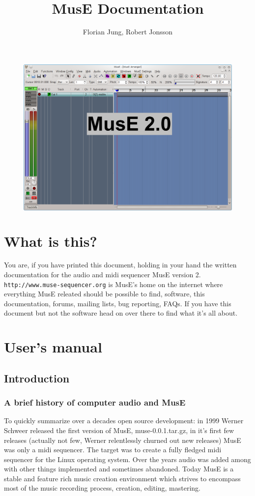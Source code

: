 \documentclass[a4paper]{report}
\author{Florian Jung, Robert Jonsson}
\title{MusE Documentation}
\newcommand{\url}[1]{\texttt{#1}}
\begin{document}
\label{Main/Arranger}
\begin{figure}[htp]
\centering
\includegraphics[width=1.0\textwidth]{pics/muse2}
\label{fig:MusE}
\end{figure}
\chapter {What is this?}
You are, if you have printed this document, holding in your hand the
written documentation for the audio and midi sequencer MusE version 2.\\ 
\url{http://www.muse-sequencer.org} is MusE's home on the internet where
everything MusE releated should be possible to find, software, this
documentation, forums, mailing lists, bug reporting, FAQs. If you have
this document but not the software head on over there to find what it's
all about.
\chapter{User's manual}

\section {Introduction}
\subsection {A brief history of computer audio and MusE}
To quickly summarize over a decades open source development: in 1999 Werner
 Schweer released the first version of MusE, muse-0.0.1.tar.gz, in it's first
few releases (actually not few, Werner relentlessly churned out new releases)
MusE was only a midi sequencer. The target was to create a fully fledged
midi sequencer for the Linux operating system. Over the years audio was
added among with other things implemented and sometimes abandoned.
Today MusE is a stable and feature rich music creation environment which
strives to encompass most of the music recording process, creation, editing,
mastering.
\end{document}
